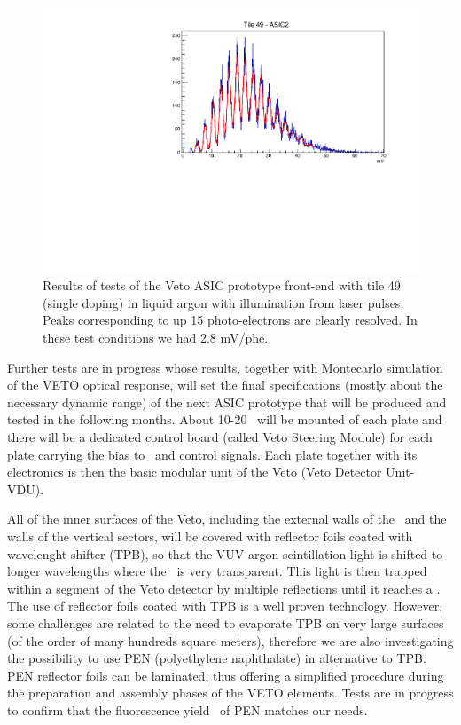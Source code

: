 \begin{figure}[!t]
\includegraphics[height=0.3\textheight]{./Figures/Laser7_8_15peaks.pdf}
\caption[Preliminary Veto ASIC front-end performance.]{Results of tests of the Veto ASIC prototype front-end with tile 49 (single doping) in liquid argon with illumination from laser pulses.
Peaks corresponding to up 15 photo-electrons are clearly resolved. In these test conditions we had 2.8 mV/phe.}
\label{fig:asic_finger}
\end{figure}

Further tests are in progress whose results, together with Montecarlo simulation of the VETO optical response, will set the final specifications (mostly about the necessary dynamic range) of the next ASIC prototype that will be produced and tested in the following months.
About 10-20 \SiPMs\ will be mounted of each plate and there will be a dedicated control board (called Veto Steering Module) for each plate carrying the bias to \SiPMs\ and control signals. Each plate together with its electronics is then  the basic modular unit of the Veto (Veto Detector Unit- VDU).

All of the inner surfaces of the Veto, including the external walls of the \TPC\ and the walls of the vertical sectors, will be covered with reflector foils coated with wavelenght shifter (TPB), so that the VUV argon scintillation light is shifted to longer wavelengths where the \LAr\ is very transparent. This light is then trapped within a segment of the Veto detector by multiple reflections until it reaches a \SiPM. 
The use of reflector foils coated with TPB is a well proven technology. However, some challenges are related to the need to evaporate TPB on very large surfaces  (of the order of many hundreds square meters), therefore we are also investigating the possibility to use PEN (polyethylene naphthalate) in alternative to TPB.  PEN  reflector foils can be laminated, thus offering a simplified procedure during the preparation and assembly phases of the VETO elements. Tests are in progress to confirm that the fluorescence yield~\cite{Kuzniak:2018dcf} of PEN matches our needs.

